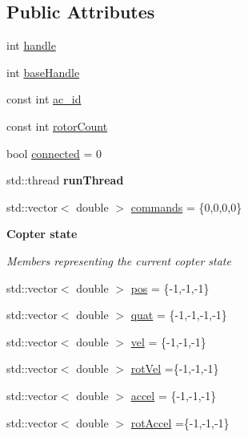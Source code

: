 \subsection*{Public Attributes}
\begin{DoxyCompactItemize}
\item 
int \hyperlink{classFinken_a96990553bc26c8bf26effe8edd6e6369}{handle}
\item 
int \hyperlink{classFinken_aef4736605ea21831e5340f66a931f8ac}{base\+Handle}
\item 
const int \hyperlink{classFinken_a496f5024f0876710ca1cfd55a2924e85}{ac\+\_\+id}
\item 
const int \hyperlink{classFinken_a2de6be70e0baaf63641df0214bf1f7a2}{rotor\+Count}
\item 
bool \hyperlink{classFinken_a83131e08852cbcebaffa1eef80164a6e}{connected} = 0
\item 
std\+::thread {\bfseries run\+Thread}\hypertarget{classFinken_a490f025c596b5c87d1c583124b53e34b}{}\label{classFinken_a490f025c596b5c87d1c583124b53e34b}

\item 
std\+::vector$<$ double $>$ \hyperlink{classFinken_aa4fe546d88b52ff92990bd67ced70567}{commands} = \{0,0,0,0\}
\end{DoxyCompactItemize}
\begin{Indent}{\bf Copter state}\par
{\em \label{classFinken_copterstate}%
\hypertarget{classFinken_copterstate}{}%
 Members representing the current copter state }\begin{DoxyCompactItemize}
\item 
std\+::vector$<$ double $>$ \hyperlink{classFinken_a726c0ea1d756fe0837a3f042665d8d4a}{pos} = \{-\/1,-\/1,-\/1\}
\item 
std\+::vector$<$ double $>$ \hyperlink{classFinken_a3968cbe3b6f76678367ecb61f044a221}{quat} = \{-\/1,-\/1,-\/1,-\/1\}
\item 
std\+::vector$<$ double $>$ \hyperlink{classFinken_a4dd260e6384e7cfb8040bd53fe1c2d62}{vel} = \{-\/1,-\/1,-\/1\}
\item 
std\+::vector$<$ double $>$ \hyperlink{classFinken_a518ab8ab8ac8cf54c0b79cbc1ec2075f}{rot\+Vel} =\{-\/1,-\/1,-\/1\}
\item 
std\+::vector$<$ double $>$ \hyperlink{classFinken_a6f9723479baee5573447036270a2a722}{accel} = \{-\/1,-\/1,-\/1\}
\item 
std\+::vector$<$ double $>$ \hyperlink{classFinken_ab1b738a1b691879be240b1b9488f7009}{rot\+Accel} =\{-\/1,-\/1,-\/1\}
\end{DoxyCompactItemize}
\end{Indent}


